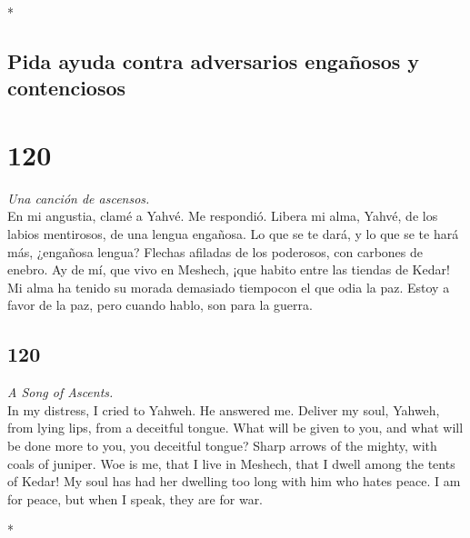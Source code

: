\begin{paracol}{2}
\switchcolumn[0]*

\hypertarget{pida-ayuda-contra-adversarios-engauxf1osos-y-contenciosos}{%
\subsection{Pida ayuda contra adversarios engañosos y
contenciosos}\label{pida-ayuda-contra-adversarios-engauxf1osos-y-contenciosos}}

\hypertarget{section-238}{%
\section{120}\label{section-238}}

\emph{Una canción de ascensos.}\\
 En mi angustia, clamé a Yahvé. Me respondió.
 Libera mi alma, Yahvé, de los labios mentirosos, de una
lengua engañosa.  Lo que se te dará, y lo que se te hará
más, ¿engañosa lengua?  Flechas afiladas de los poderosos,
con carbones de enebro.  Ay de mí, que vivo en Meshech,
¡que habito entre las tiendas de Kedar!  Mi alma ha tenido
su morada demasiado tiempocon el que odia la paz.  Estoy a
favor de la paz, pero cuando hablo, son para la guerra.

\switchcolumn
\begin{otherlanguage}{english}

\hypertarget{section-239}{%
\section{120}\label{section-239}}

\emph{A Song of Ascents.}\\
 In my distress, I cried to Yahweh. He answered me.
 Deliver my soul, Yahweh, from lying lips, from a
deceitful tongue.  What will be given to you, and what
will be done more to you, you deceitful tongue?  Sharp
arrows of the mighty, with coals of juniper.  Woe is me,
that I live in Meshech, that I dwell among the tents of Kedar!
 My soul has had her dwelling too long with him who hates
peace.  I am for peace, but when I speak, they are for
war.

\end{otherlanguage}

\switchcolumn[0]*

\hypertarget{el-fiel-guardiuxe1n-del-pueblo}{%
}
\end{paracol}
